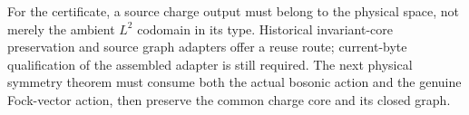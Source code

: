 For the certificate, a source charge output must belong to the
physical space, not merely the ambient $L^2$ codomain in its type.
Historical invariant-core preservation and source graph adapters
offer a reuse route; current-byte qualification of the assembled
adapter is still required. The next physical symmetry theorem must
consume both the actual bosonic action and the genuine Fock-vector
action, then preserve the common charge core and its closed graph.
